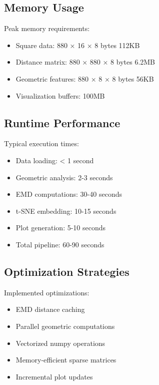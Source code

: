 \documentclass[11pt]{article}
\begin{document}
\subsection{Memory Usage}
Peak memory requirements:
\begin{itemize}
    \item Square data: 880 × 16 × 8 bytes \approx 112KB
    \item Distance matrix: 880 × 880 × 8 bytes \approx 6.2MB
    \item Geometric features: 880 × 8 × 8 bytes \approx 56KB
    \item Visualization buffers: \approx 100MB
\end{itemize}

\subsection{Runtime Performance}
Typical execution times:
\begin{itemize}
    \item Data loading: < 1 second
    \item Geometric analysis: 2-3 seconds
    \item EMD computations: 30-40 seconds
    \item t-SNE embedding: 10-15 seconds
    \item Plot generation: 5-10 seconds
    \item Total pipeline: 60-90 seconds
\end{itemize}

\subsection{Optimization Strategies}
Implemented optimizations:
\begin{itemize}
    \item EMD distance caching
    \item Parallel geometric computations
    \item Vectorized numpy operations
    \item Memory-efficient sparse matrices
    \item Incremental plot updates
\end{itemize}
\end{document}

